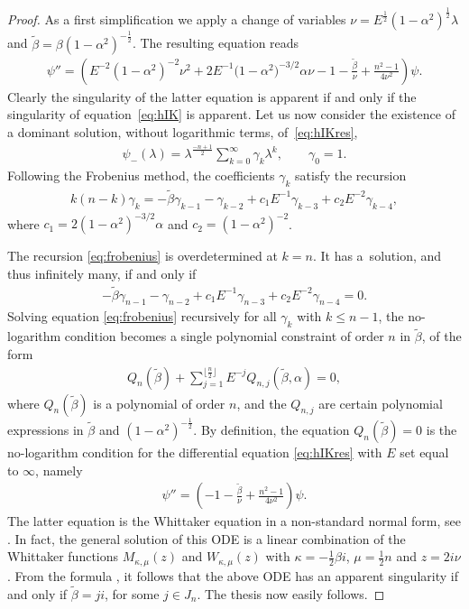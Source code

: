 \documentclass[pdftex]{sigma}
\numberwithin{equation}{section}
\newcommand{\la}{\lambda}
\newcommand{\al}{\alpha}
\begin{document}
\begin{proof}
	As a f\/irst simplif\/ication we apply a change of variables
	$\nu=E^{\frac{1}{2}}(1-\al^2)^{\frac12}\la$ and $\tilde{\beta}=\beta(1-\al^2)^{-\frac12}$. The resulting equation reads
	\begin{gather}\label{eq:hIKres}
	\psi''= \left(E^{-2}(1-\alpha^2)^{-2}\nu^2 + 2 E^{-1}\big(1-\alpha^2\big)^{-3/2} \al \nu-1- \frac{\tilde{\beta}}{\nu} + \frac{n^2-1}{4 \nu^2}
	\right) \psi .
	\end{gather}
	Clearly the singularity of the latter equation is apparent if and only if the singularity of equation~\eqref{eq:hIK} is apparent. Let us now consider the existence of a dominant solution, without logarithmic terms, of~\eqref{eq:hIKres},
	\begin{gather*}
	\psi_-(\la)=\la^{\frac{-n+1}{2}}\sum_{k=0}^\infty \gamma_k \la^k,\qquad \gamma_0=1.
	\end{gather*}
	Following the Frobenius method, the coef\/f\/icients $\gamma_k$ satisfy the recursion
	\begin{gather}\label{eq:frobenius}
	k(n-k)\gamma_k= - \tilde{\beta} \gamma_{k-1}-\gamma_{k-2}+c_1 E^{-1} \gamma_{k-3}+ c_2 E^{-2} \gamma_{k-4} ,
	\end{gather}
	where $c_1=2 (1-\alpha^2)^{-3/2} \al$ and $c_2=(1-\alpha^2)^{-2}$.

	The recursion \eqref{eq:frobenius} is overdetermined at $k=n$. It has a~solution, and thus inf\/initely many, if and only if
	\begin{gather*}
	-\tilde{\beta} \gamma_{n-1}-\gamma_{n-2}+c_1 E^{-1} \gamma_{n-3}+ c_2 E^{-2} \gamma_{n-4}=0 .
	\end{gather*}
	Solving equation \eqref{eq:frobenius} recursively for all
	$\gamma_k$ with $k \leq n-1$, the no-logarithm condition becomes a single polynomial constraint of order $n$ in $\tilde{\beta}$, of the form
	\begin{gather*}
	Q_n(\tilde{\beta})+ \sum_{j=1}^{\lfloor \frac n2 \rfloor}E^{-j}Q_{n,j}(\tilde{\beta},\alpha)=0,
	\end{gather*}
	where $Q_n(\tilde{\beta})$ is a polynomial of order $n$, and the $Q_{n,j}$ are certain polynomial expressions in $\tilde{\beta}$ and
	$(1-\al^2)^{-\frac12}$. By def\/inition, the equation $Q_n(\tilde{\beta})=0$ is the no-logarithm condition for the
	dif\/ferential equation \eqref{eq:hIKres} with $E$ set equal to $\infty$, namely
	\begin{gather*}
	\psi''=\left(- 1 - \frac{\tilde{\beta} }{\nu}+\frac{n^2-1}{4 \nu^2}\right)\psi.
	\end{gather*}
	The latter equation is the Whittaker equation in a non-standard normal form, see \cite[Section~13.14]{nist}. 	In fact, the general solution of this ODE is a linear combination of the Whittaker functions $M_{\kappa,\mu}(z)$ and $W_{\kappa,\mu}(z)$ with $\kappa=-\tfrac{1}{2} \beta i$, $\mu=\tfrac{1}{2}n$ and $z= 2 i\nu$. From the formula \cite[equation~(13.14.18)]{nist}, it follows that the above ODE has an apparent singularity if and only if $\tilde{\beta}=j i$, for some $j \in J_n$. The thesis now easily follows.
\end{proof}
\end{document}

